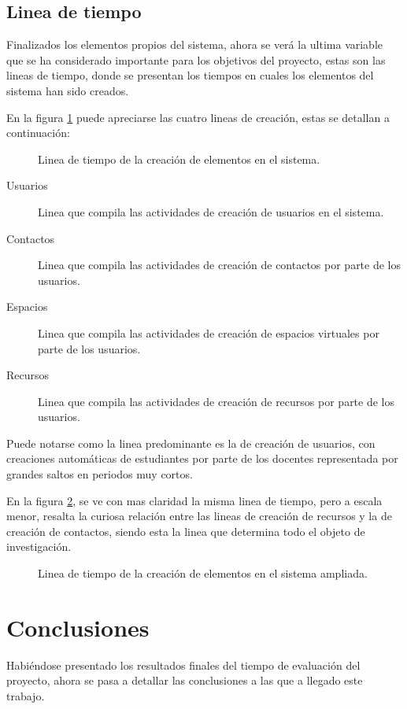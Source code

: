 \subsection{Linea de tiempo}
Finalizados los elementos propios del sistema, ahora se verá la ultima variable
que se ha considerado importante para los objetivos del proyecto, estas son las
lineas de tiempo, donde se presentan los tiempos en cuales los elementos del
sistema han sido creados.

En la figura \ref{tiempos_area_1} puede apreciarse las cuatro lineas de
creación, estas se detallan a continuación:

\begin{figure}
\centering

\caption{Linea de tiempo de la creación de elementos en el sistema.}
\label{tiempos_area_1}
\end{figure}

\begin{description}
\item [Usuarios] Linea que compila las actividades de creación de usuarios en el
sistema.
\item [Contactos] Linea que compila las actividades de creación de contactos por
parte de los usuarios.
\item [Espacios] Linea que compila las actividades de creación de espacios
virtuales por parte de los usuarios.
\item [Recursos] Linea que compila las actividades de creación de recursos por
parte de los usuarios.
\end{description}

Puede notarse como la linea predominante es la de creación de usuarios, con
creaciones automáticas de estudiantes por parte de los docentes representada por
grandes saltos en periodos muy cortos.

En la figura \ref{tiempos_area_2}, se ve con mas claridad la misma linea de
tiempo, pero a escala menor, resalta la curiosa relación entre las lineas
de creación de recursos y la de creación de contactos, siendo esta la linea que
determina todo el objeto de investigación.

\begin{figure}
\centering

\caption{Linea de tiempo de la creación de elementos en el sistema ampliada.}
\label{tiempos_area_2}
\end{figure}

\section{Conclusiones}
Habiéndose presentado los resultados finales del tiempo de evaluación del
proyecto, ahora se pasa a detallar las conclusiones a las que a llegado este
trabajo.

